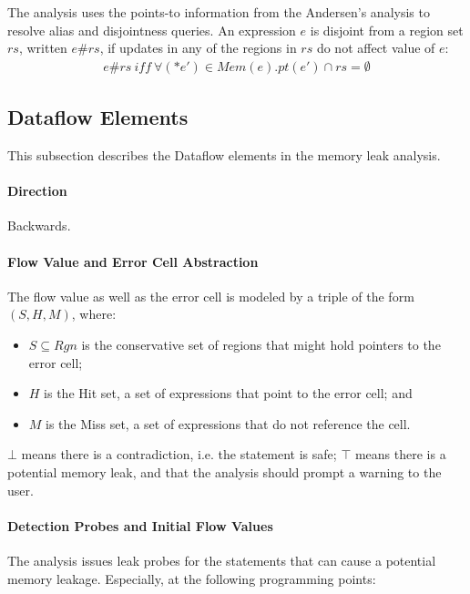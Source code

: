 The analysis uses the points-to information from the Andersen's analysis 
to resolve alias and disjointness queries. 
An expression $e$ is disjoint from a region set 
$rs$, written $e\#rs$, if updates in any of the regions in $rs$ do not 
affect value of $e$:
\begin{align*}
e\#rs \ iff \ \forall(*e')\in Mem(e). pt(e')\cap rs=\emptyset
\end{align*}



\subsection{Dataflow Elements}
\label{ss:dataflow}

This subsection describes the Dataflow elements in the memory leak analysis. 

\paragraph{Direction}

Backwards.

\paragraph{Flow Value and Error Cell Abstraction}

The flow value as well as the error cell is modeled by a triple of the form 
$(S,H,M)$, where:

\begin{itemize}
  \item $S\subseteq Rgn$ is the conservative set of regions that might hold 
    pointers to the error cell;
  \item $H$ is the Hit set, a set of expressions that point to the error cell; and 
  \item $M$ is the Miss set, a set of expressions that do not reference the cell.
\end{itemize}

$\bot$ means there is a contradiction, i.e. the statement is safe; 
$\top$ means there is a potential memory leak, and that the analysis should 
prompt a warning to the user.

\paragraph{Detection Probes and Initial Flow Values}

The analysis issues leak probes for the statements that can cause a potential 
memory leakage. Especially, at the following programming points:

